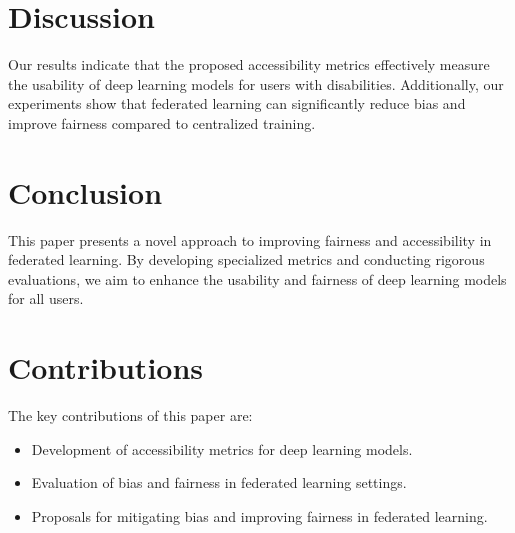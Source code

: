 \documentclass{article}
\begin{document}
\section{Discussion}
Our results indicate that the proposed accessibility metrics effectively measure the usability of deep learning models for users with disabilities. Additionally, our experiments show that federated learning can significantly reduce bias and improve fairness compared to centralized training.

\section{Conclusion}
This paper presents a novel approach to improving fairness and accessibility in federated learning. By developing specialized metrics and conducting rigorous evaluations, we aim to enhance the usability and fairness of deep learning models for all users.

\section{Contributions}
The key contributions of this paper are:
\begin{itemize}
    \item Development of accessibility metrics for deep learning models.
    \item Evaluation of bias and fairness in federated learning settings.
    \item Proposals for mitigating bias and improving fairness in federated learning.
\end{itemize}
\end{document}

